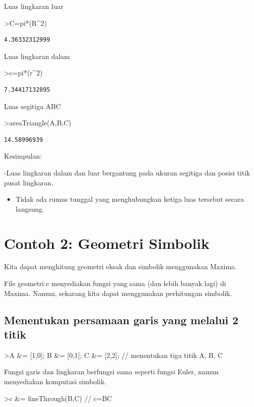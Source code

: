 \documentclass[
]{book}
\providecommand{\tightlist}{%
  \setlength{\itemsep}{0pt}\setlength{\parskip}{0pt}}
\begin{document}
Luas lingkaran luar

\textgreater C=pi*(R\^{}2)

\begin{verbatim}
4.36332312999
\end{verbatim}

Luas lingkaran dalam

\textgreater c=pi*(r\^{}2)

\begin{verbatim}
7.34417132895
\end{verbatim}

Luas segitiga ABC

\textgreater areaTriangle(A,B,C)

\begin{verbatim}
14.58996939
\end{verbatim}

Kesimpulan:

-Luas lingkaran dalam dan luar bergantung pada ukuran segitiga dan posisi titik pusat lingkaran.

\begin{itemize}
\tightlist
\item
  Tidak ada rumus tunggal yang menghubungkan ketiga luas tersebut secara langsung.
\end{itemize}

\chapter{Contoh 2: Geometri Simbolik}\label{contoh-2-geometri-simbolik}

Kita dapat menghitung geometri eksak dan simbolik menggunakan Maxima.

File geometri.e menyediakan fungsi yang sama (dan lebih banyak lagi) di Maxima. Namun, sekarang kita dapat menggunakan perhitungan simbolik.

\section{Menentukan persamaan garis yang melalui 2 titik}\label{menentukan-persamaan-garis-yang-melalui-2-titik}

\textgreater A \&= {[}1,0{]}; B \&= {[}0,1{]}; C \&= {[}2,2{]}; // menentukan tiga titik A, B, C

Fungsi garis dan lingkaran berfungsi sama seperti fungsi Euler, namun menyediakan komputasi simbolik.

\textgreater c \&= lineThrough(B,C) // c=BC
\end{document}

